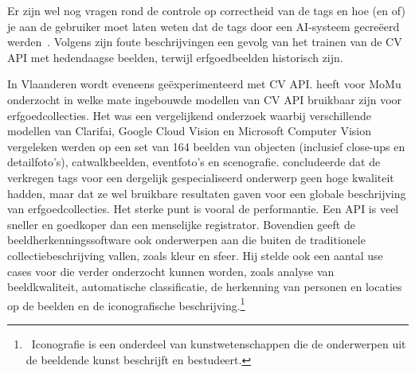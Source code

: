 Er zijn wel nog vragen rond de controle op correctheid van de tags en hoe (en of) je aan de gebruiker moet laten weten dat de tags door een AI-systeem gecre\"{e}erd werden~\autocite{Moriarty2018a}. Volgens \textcite{Hindle2017} zijn foute beschrijvingen een gevolg van het trainen van de CV API met hedendaagse beelden, terwijl erfgoedbeelden historisch zijn.

In Vlaanderen wordt eveneens ge\"{e}xperimenteerd met CV API. \textcite{Vanstappen2019} heeft voor MoMu onderzocht in welke mate ingebouwde modellen van CV API bruikbaar zijn voor erfgoedcollecties. Het was een vergelijkend onderzoek waarbij verschillende modellen van Clarifai, Google Cloud Vision en Microsoft Computer Vision vergeleken werden op een set van 164 beelden van objecten (inclusief close-ups en detailfoto’s), catwalkbeelden, eventfoto’s en scenografie. \textcite{Vanstappen2019} concludeerde dat de verkregen tags voor een dergelijk gespecialiseerd onderwerp geen hoge kwaliteit hadden, maar dat ze wel bruikbare resultaten gaven voor een globale beschrijving van erfgoedcollecties. Het sterke punt is vooral de performantie. Een API is veel sneller en goedkoper dan een menselijke registrator. Bovendien geeft de beeldherkenningssoftware ook onderwerpen aan die buiten de traditionele collectiebeschrijving vallen, zoals kleur en sfeer. Hij stelde ook een aantal use cases voor die verder onderzocht kunnen worden, zoals analyse van beeldkwaliteit, automatische classificatie, de herkenning van personen en locaties op de beelden en de iconografische beschrijving.\footnote{~Iconografie is een onderdeel van kunstwetenschappen die de onderwerpen uit de beeldende kunst beschrijft en bestudeert.}

